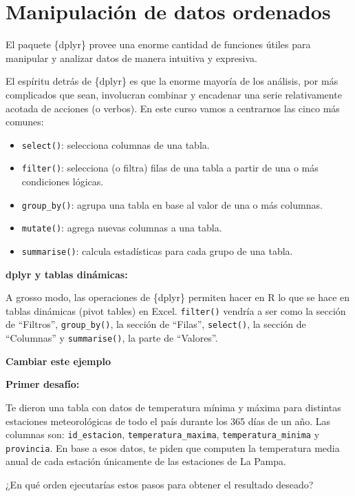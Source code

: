 \documentclass[
  openany]{book}
\providecommand{\tightlist}{%
  \setlength{\itemsep}{0pt}\setlength{\parskip}{0pt}}
\begin{document}
\hypertarget{manipulaciuxf3n-de-datos-ordenados}{%
\chapter{Manipulación de datos ordenados}\label{manipulaciuxf3n-de-datos-ordenados}}

El paquete \{dplyr\} provee una enorme cantidad de funciones útiles para manipular y analizar datos de manera intuitiva y expresiva.

El espíritu detrás de \{dplyr\} es que la enorme mayoría de los análisis, por más complicados que sean, involucran combinar y encadenar una serie relativamente acotada de acciones (o verbos).
En este curso vamos a centrarnos las cinco más comunes:

\begin{itemize}
\tightlist
\item
  \texttt{select()}: selecciona columnas de una tabla.
\item
  \texttt{filter()}: selecciona (o filtra) filas de una tabla a partir de una o más condiciones lógicas.
\item
  \texttt{group\_by()}: agrupa una tabla en base al valor de una o más columnas.
\item
  \texttt{mutate()}: agrega nuevas columnas a una tabla.
\item
  \texttt{summarise()}: calcula estadísticas para cada grupo de una tabla.
\end{itemize}

\textbf{dplyr y tablas dinámicas:}

A grosso modo, las operaciones de \{dplyr\} permiten hacer en R lo que se hace en tablas dinámicas (pivot tables) en Excel.
\texttt{filter()} vendría a ser como la sección de ``Filtros'', \texttt{group\_by()}, la sección de ``Filas'', \texttt{select()}, la sección de ``Columnas'' y \texttt{summarise()}, la parte de ``Valores''.

\textbf{Cambiar este ejemplo}

\textbf{Primer desafío:}

Te dieron una tabla con datos de temperatura mínima y máxima para distintas estaciones meteorológicas de todo el país durante los 365 días de un año.
Las columnas son: \texttt{id\_estacion}, \texttt{temperatura\_maxima}, \texttt{temperatura\_minima} y \texttt{provincia}.
En base a esos datos, te piden que computen la temperatura media anual de cada estación únicamente de las estaciones de La Pampa.

¿En qué orden ejecutarías estos pasos para obtener el resultado deseado?
\end{document}
